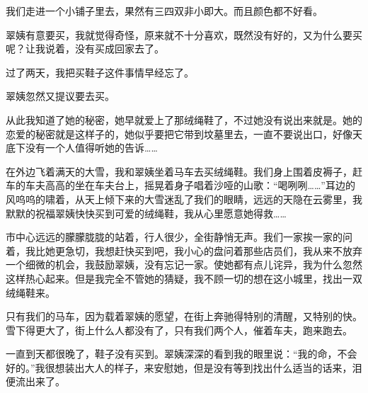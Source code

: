 \par 我们走进一个小铺子里去，果然有三四双非小即大。而且颜色都不好看。
\par 翠姨有意要买，我就觉得奇怪，原来就不十分喜欢，既然没有好的，又为什么要买呢？让我说着，没有买成回家去了。
\par 过了两天，我把买鞋子这件事情早经忘了。
\par 翠姨忽然又提议要去买。
\par 从此我知道了她的秘密，她早就爱上了那绒绳鞋了，不过她没有说出来就是。她的恋爱的秘密就是这样子的，她似乎要把它带到坟墓里去，一直不要说出口，好像天底下没有一个人值得听她的告诉……
\par 在外边飞着满天的大雪，我和翠姨坐着马车去买绒绳鞋。我们身上围着皮褥子，赶车的车夫高高的坐在车夫台上，摇晃着身子唱着沙哑的山歌：“喝咧咧……”耳边的风呜呜的啸着，从天上倾下来的大雪迷乱了我们的眼睛，远远的天隐在云雾里，我默默的祝福翠姨快快买到可爱的绒绳鞋，我从心里愿意她得救……
\par 市中心远远的朦朦胧胧的站着，行人很少，全街静悄无声。我们一家挨一家的问着，我比她更急切，我想赶快买到吧，我小心的盘问着那些店员们，我从来不放弃一个细微的机会，我鼓励翠姨，没有忘记一家。使她都有点儿诧异，我为什么忽然这样热心起来。但是我完全不管她的猜疑，我不顾一切的想在这小城里，找出一双绒绳鞋来。
\par 只有我们的马车，因为载着翠姨的愿望，在街上奔驰得特别的清醒，又特别的快。雪下得更大了，街上什么人都没有了，只有我们两个人，催着车夫，跑来跑去。
\par 一直到天都很晚了，鞋子没有买到。翠姨深深的看到我的眼里说：“我的命，不会好的。”我很想装出大人的样子，来安慰她，但是没有等到找出什么适当的话来，泪便流出来了。
